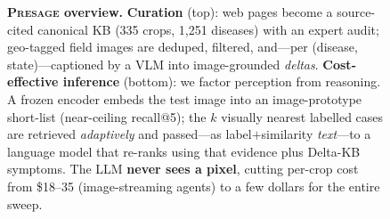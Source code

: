 \begin{figure}[!t]
{\begin{tikzpicture}
\end{tikzpicture}
}%
\caption{\textbf{\textsc{Presage} overview.} \textbf{Curation} (top): web pages
become a source-cited canonical KB (335 crops, 1{,}251 diseases) with an expert
audit; geo-tagged field images are deduped, filtered, and---per (disease,
state)---captioned by a VLM into image-grounded \emph{deltas}.
\textbf{Cost-effective inference} (bottom): we factor perception from
reasoning. A frozen encoder embeds the test image into an image-prototype
short-list (near-ceiling recall@5); the $k$ visually nearest labelled cases are
retrieved \emph{adaptively} and passed---as label$+$similarity \emph{text}---to
a language model that re-ranks using that evidence plus Delta-KB symptoms. The
LLM \textbf{never sees a pixel}, cutting per-crop cost from \$18--35
(image-streaming agents) to a few dollars for the entire sweep.}
\label{fig:teaser}
\end{figure}

